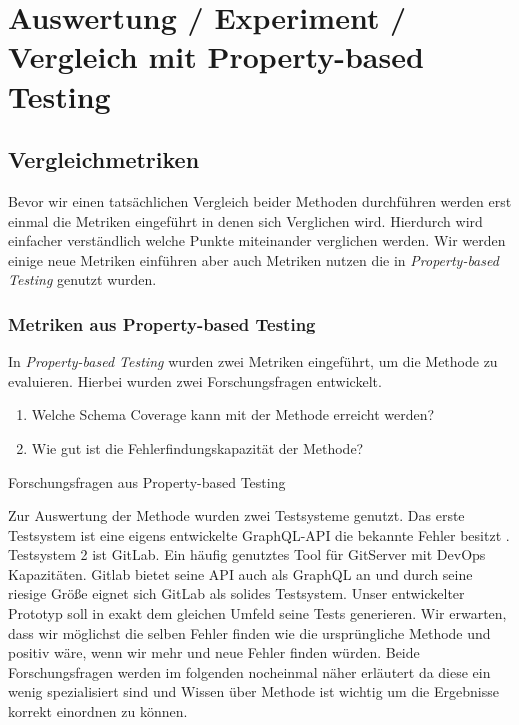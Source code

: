 \chapter{Auswertung / Experiment / Vergleich mit Property-based Testing}

\section{Vergleichmetriken}
Bevor wir einen tatsächlichen Vergleich beider Methoden durchführen werden erst einmal die Metriken eingeführt in denen
sich Verglichen wird.
Hierdurch wird einfacher verständlich welche Punkte miteinander verglichen werden.
Wir werden einige neue Metriken einführen aber auch Metriken nutzen die in \textit{Property-based Testing}\cite{property-based-testing} genutzt wurden.

\subsection{Metriken aus Property-based Testing}

In \textit{Property-based Testing} wurden zwei Metriken eingeführt, um die Methode zu evaluieren.
Hierbei wurden zwei Forschungsfragen entwickelt.

\begin{enumerate}
    \item Welche Schema Coverage kann mit der Methode erreicht werden? \cite[vgl. RQ1]{property-based-testing}
    \item Wie gut ist die Fehlerfindungskapazität der Methode? \cite[vgl. RG2]{property-based-testing}
\end{enumerate}
\caption{Forschungsfragen aus Property-based Testing}

Zur Auswertung der Methode wurden zwei Testsysteme genutzt.
Das erste Testsystem ist eine eigens entwickelte GraphQL-API die bekannte Fehler besitzt \cite[vgl. A.1]{property-based-testing}.
Testsystem 2 ist GitLab.
Ein häufig genutztes Tool für GitServer mit DevOps Kapazitäten.
Gitlab bietet seine API auch als GraphQL an und durch seine riesige Größe eignet sich GitLab als solides Testsystem. \cite[vgl. A2]{property-based-testing}
Unser entwickelter Prototyp soll in exakt dem gleichen Umfeld seine Tests generieren.
Wir erwarten, dass wir möglichst die selben Fehler finden wie die ursprüngliche Methode und positiv wäre, wenn wir mehr und neue Fehler finden würden.
Beide Forschungsfragen werden im folgenden nocheinmal näher erläutert da diese ein wenig spezialisiert sind und Wissen über Methode
ist wichtig um die Ergebnisse korrekt einordnen zu können.

